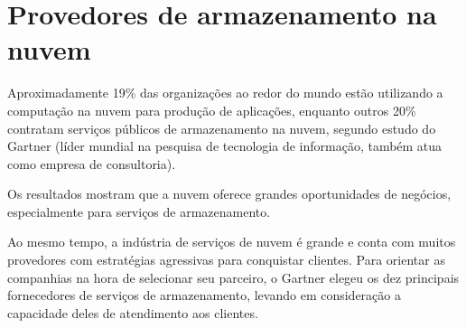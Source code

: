 \chapter{Provedores de armazenamento na nuvem}

Aproximadamente 19\% das organizações ao redor do mundo estão utilizando a
computação na nuvem para produção de aplicações, enquanto outros 20\% contratam
serviços públicos de armazenamento na nuvem, segundo estudo do Gartner (líder
mundial na pesquisa de tecnologia de informação, também atua como empresa de
consultoria).

Os resultados mostram que a nuvem oferece grandes oportunidades de negócios,
especialmente para serviços de armazenamento. 

Ao mesmo tempo, a indústria de serviços de nuvem é grande e conta com muitos
provedores com estratégias agressivas para conquistar clientes. Para orientar as
companhias na hora de selecionar seu parceiro, o Gartner elegeu os dez principais
fornecedores de serviços de armazenamento, levando em consideração a capacidade
deles de atendimento aos clientes.
